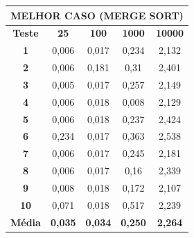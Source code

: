 \documentclass[a4paper, 12pt]{article}
\begin{document}
\begin{minipage}{1.0\textwidth}
  \begin{minipage}[c]{0.49\textwidth}
  \centering
\begin{tabular}{ccccc}

                     \multicolumn{ 5}{c}{{\bf MELHOR CASO (MERGE SORT)}} \\
\hline
{\bf Teste} &   {\bf 25} &  {\bf 100} & {\bf 1000} & {\bf 10000} \\
\hline
   {\bf 1} &      0,006 &      0,017 &      0,234 &      2,132 \\
\hline
   {\bf 2} &      0,006 &      0,181 &       0,31 &      2,401 \\
\hline
   {\bf 3} &      0,005 &      0,017 &      0,257 &      2,149 \\
\hline
   {\bf 4} &      0,006 &      0,018 &      0,008 &      2,129 \\
\hline
   {\bf 5} &      0,006 &      0,018 &      0,237 &      2,424 \\
\hline
   {\bf 6} &      0,234 &      0,017 &      0,363 &      2,538 \\
\hline
   {\bf 7} &      0,006 &      0,017 &      0,245 &      2,181 \\
\hline
   {\bf 8} &      0,006 &      0,017 &       0,16 &      2,339 \\
\hline
   {\bf 9} &      0,008 &      0,018 &      0,172 &      2,107 \\
\hline
  {\bf 10} &      0,071 &      0,018 &      0,517 &      2,239 \\
\hline
{\bf Média} & {\bf 0,035} & {\bf 0,034} & {\bf 0,250} & {\bf 2,264} \\
\hline
\end{tabular}  


  \end{minipage}
 \hfill
 \begin{minipage}[c]{0.49\textwidth}
 \centering
{}

\end{minipage}
\end{minipage}
\end{document}
